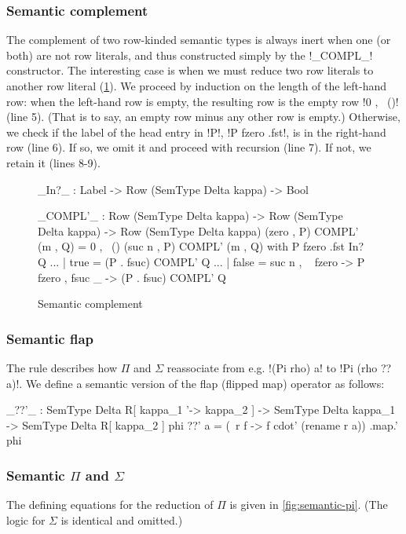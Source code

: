 \documentclass[sigplan,10pt,anonymous,review]{acmart}\settopmatter{printfolios=true,printccs=false,printacmref=false}
\begin{document}
\subsubsection{Semantic complement} The complement of two row-kinded semantic types is always inert when one (or both) are not row literals, and thus constructed simply by the !_COMPL_! constructor. The interesting case is when we must reduce two row literals to another row literal (\cref{fig:semantic-complement}). We proceed by induction on the length of the left-hand row: when the left-hand row is empty, the resulting row is the empty row !0 , \ ()! (line 5). (That is to say, an empty row minus any other row is empty.) Otherwise, we check if the label of the head entry in !P!, !P fzero .fst!, is in the right-hand row (line 6). If so, we omit it and proceed with recursion (line 7). If not, we retain it (lines 8-9).

\begin{figure}
\begin{agda}
_In?_ : Label -> Row (SemType Delta kappa) -> Bool

_COMPL'_ : Row (SemType Delta kappa) -> Row (SemType Delta kappa) -> 
           Row (SemType Delta kappa)
(zero , P) COMPL' (m , Q) = 0 , \ () 
(suc n , P) COMPL' (m , Q) with P fzero .fst In? Q 
... | true = (P . fsuc) COMPL' Q
... | false = suc n , \ { fzero -> P fzero , 
                          fsuc _ -> (P . fsuc) COMPL' Q }
\end{agda}
\caption{Semantic complement}
\label{fig:semantic-complement}
\end{figure}

\subsubsection{Semantic flap}
The rule  describes how $\Pi$ and $\Sigma$ reassociate from e.g. !(Pi rho) a! to !Pi (rho ?? a)!. We define a semantic version of the flap (flipped map) operator as follows:

\begin{agda}
_??'_ : SemType Delta R[ kappa_1 '-> kappa_2 ] -> 
       SemType Delta kappa_1 -> SemType Delta R[ kappa_2 ]
phi ??' a = (\ r f -> f cdot' (rename r a)) .map.' phi
\end{agda}

\subsubsection{Semantic $\Pi$ and $\Sigma$} The defining equations for the reduction of $\Pi$ is given in \cref{fig:semantic-pi}. (The logic for $\Sigma$ is identical and omitted.)
\end{document}
